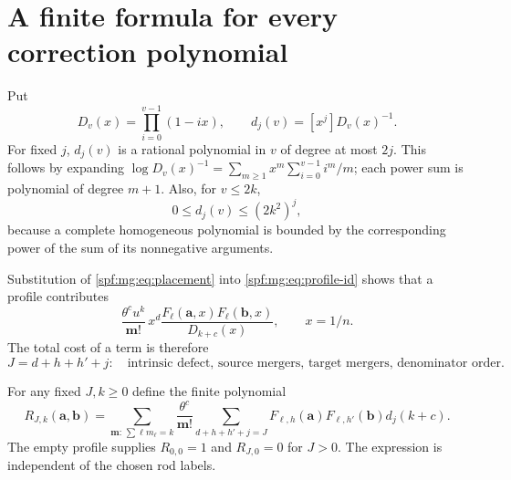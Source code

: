 \documentclass[11pt]{article}
\numberwithin{equation}{section}
\theoremstyle{definition}
\theoremstyle{remark}
\theoremstyle{definition}
\newcommand{\mga}{\boldsymbol a}
\newcommand{\mgb}{\boldsymbol b}
\newcommand{\mgm}{\mathbf m}
\newcommand{\mgl}{\boldsymbol\ell}
\newcommand{\mgmf}{\mathbf m!}
\begin{document}
\section{A finite formula for every correction polynomial}
\label{spf:mg:sec:coefficients}

Put
\begin{equation}
 D_v(x)=\prod_{i=0}^{v-1}(1-ix),\qquad
 d_j(v)=[x^j]D_v(x)^{-1}.
 \label{spf:mg:eq:Dv}
\end{equation}
For fixed $j$, $d_j(v)$ is a rational polynomial in $v$ of degree at most
$2j$. This follows by expanding
$\log D_v(x)^{-1}=\sum_{m\ge1}x^m\sum_{i=0}^{v-1}i^m/m$;
each power sum is polynomial of degree $m+1$.
Also, for $v\le2k$,
\begin{equation}
 0\le d_j(v)\le(2k^2)^j,
 \label{spf:mg:eq:d-bound}
\end{equation}
because a complete homogeneous polynomial is bounded by the corresponding
power of the sum of its nonnegative arguments.

Substitution of \eqref{spf:mg:eq:placement} into \eqref{spf:mg:eq:profile-id} shows that
a profile contributes
\begin{equation}
 \frac{\theta^c u^k}{\mgmf}\,
 x^d\frac{F_{\mgl}(\mga,x)F_{\mgl}(\mgb,x)}{D_{k+c}(x)},
 \qquad x=1/n.
 \label{spf:mg:eq:normalized-profile}
\end{equation}
The total cost of a term is therefore
\begin{equation}
 J=d+h+h'+j:
 \quad\text{intrinsic defect, source mergers, target mergers, denominator order.}
 \label{spf:mg:eq:cost}
\end{equation}

For any fixed $J,k\ge0$ define the finite polynomial
\begin{equation}
 R_{J,k}(\mga,\mgb)=
 \sum_{\mgm:\,\sum\ell m_\ell=k}\frac{\theta^c}{\mgmf}
 \sum_{d+h+h'+j=J}
   F_{\mgl,h}(\mga)F_{\mgl,h'}(\mgb)d_j(k+c).
 \label{spf:mg:eq:R}
\end{equation}
The empty profile supplies $R_{0,0}=1$ and $R_{J,0}=0$ for $J>0$.
The expression is independent of the chosen rod labels.
\end{document}
